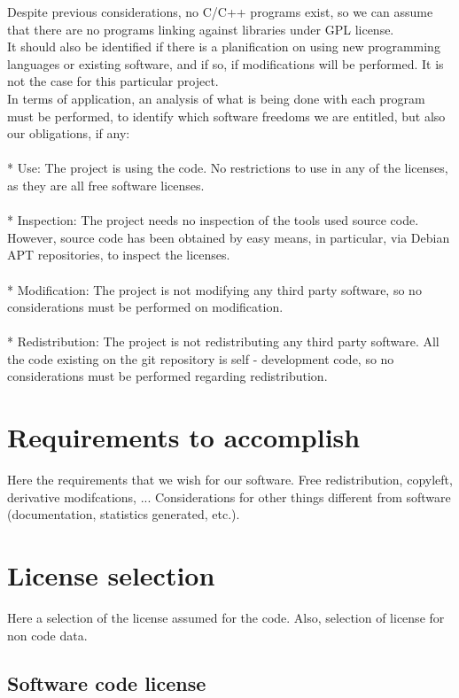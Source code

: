 \documentclass[11pt]{article}
\begin{document}
Despite previous considerations, no C/C++ programs exist, so we can assume that there are no programs linking against libraries under GPL license.\\
It should also be identified if there is a planification on using new programming languages or existing software, and if so, if modifications will be performed. It is not the case for this particular project.\\
In terms of application, an analysis of what is being done with each program must be performed, to identify which software freedoms we are entitled, but also our obligations, if any:\\
\\
* Use: The project is using the code. No restrictions to use in any of the licenses, as they are all free software licenses.\\
\\
* Inspection: The project needs no inspection of the tools used source code. However, source code has been obtained by easy means, in particular, via Debian APT repositories, to inspect the licenses.\\
\\
* Modification: The project is not modifying any third party software, so no considerations must be performed on modification.\\
\\
* Redistribution: The project is not redistributing any third party software. All the code existing on the git repository is self - development code, so no considerations must be performed regarding redistribution.

\section{Requirements to accomplish}

Here the requirements that we wish for our software. Free redistribution, copyleft, derivative modifcations, ...
Considerations for other things different from software (documentation, statistics generated, etc.).

\section{License selection}

Here a selection of the license assumed for the code. 
Also, selection of license for non code data.
\subsection{Software code license}
\end{document}
